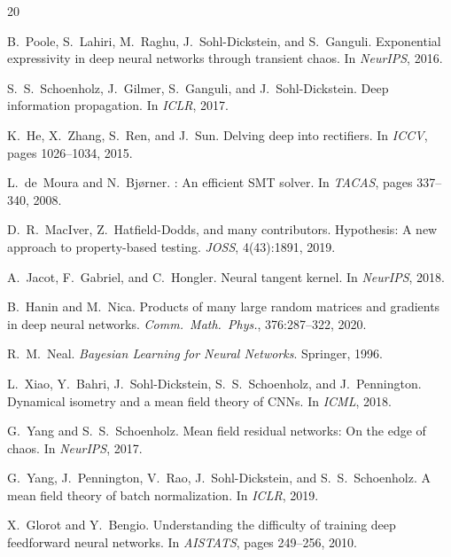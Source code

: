 \documentclass[10pt]{article}
\begin{document}
\begin{thebibliography}{20}

B.~Poole, S.~Lahiri, M.~Raghu, J.~Sohl-Dickstein, and S.~Ganguli.
\newblock Exponential expressivity in deep neural networks through transient chaos.
\newblock In \emph{NeurIPS}, 2016.

S.~S.~Schoenholz, J.~Gilmer, S.~Ganguli, and J.~Sohl-Dickstein.
\newblock Deep information propagation.
\newblock In \emph{ICLR}, 2017.

K.~He, X.~Zhang, S.~Ren, and J.~Sun.
\newblock Delving deep into rectifiers.
\newblock In \emph{ICCV}, pages 1026--1034, 2015.

L.~de~Moura and N.~Bj{\o}rner.
: An efficient {SMT} solver.
\newblock In \emph{TACAS}, pages 337--340, 2008.

D.~R.~MacIver, Z.~Hatfield-Dodds, and many contributors.
\newblock Hypothesis: A new approach to property-based testing.
\newblock \emph{JOSS}, 4(43):1891, 2019.

A.~Jacot, F.~Gabriel, and C.~Hongler.
\newblock Neural tangent kernel.
\newblock In \emph{NeurIPS}, 2018.

B.~Hanin and M.~Nica.
\newblock Products of many large random matrices and gradients in deep neural networks.
\newblock \emph{Comm.\ Math.\ Phys.}, 376:287--322, 2020.

R.~M.~Neal.
\newblock \emph{Bayesian Learning for Neural Networks}.
\newblock Springer, 1996.

L.~Xiao, Y.~Bahri, J.~Sohl-Dickstein, S.~S.~Schoenholz, and J.~Pennington.
\newblock Dynamical isometry and a mean field theory of {CNN}s.
\newblock In \emph{ICML}, 2018.

G.~Yang and S.~S.~Schoenholz.
\newblock Mean field residual networks: On the edge of chaos.
\newblock In \emph{NeurIPS}, 2017.

G.~Yang, J.~Pennington, V.~Rao, J.~Sohl-Dickstein, and S.~S.~Schoenholz.
\newblock A mean field theory of batch normalization.
\newblock In \emph{ICLR}, 2019.

X.~Glorot and Y.~Bengio.
\newblock Understanding the difficulty of training deep feedforward neural networks.
\newblock In \emph{AISTATS}, pages 249--256, 2010.


\end{thebibliography}
\end{document}
